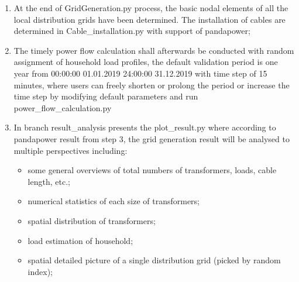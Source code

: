\documentclass[letterpaper,10pt,english]{sphinxmanual}
\begin{document}
\begin{enumerate}
\begin{itemize}
\item {} 
\sphinxAtStartPar
the optimal positions of manually grouped distribution grids are determined by minimal power\sphinxhyphen{}distance algorithm,
aiming to minimize the network voltage band, energy losses on conductors and with shorter total cable length;

\end{itemize}

\item {} 
\sphinxAtStartPar
At the end of GridGeneration.py process, the basic nodal elements of all the local distribution grids have been
determined. The installation of cables are determined in Cable\_installation.py with support of pandapower;

\item {} 
\sphinxAtStartPar
The timely power flow calculation shall afterwards be conducted with random assignment of household load profiles,
the default validation period is one year from 00:00:00 01.01.2019 \sphinxhyphen{} 24:00:00 31.12.2019 with time step of 15
minutes, where users can freely shorten or prolong the period or increase the time step by modifying default
parameters and run power\_flow\_calculation.py

\item {} 
\sphinxAtStartPar
In branch result\_analysis presents the plot\_result.py where according to pandapower result from step 3, the grid
generation result will be analysed to multiple perspectives including:
\begin{itemize}
\item {} 
\sphinxAtStartPar
some general overviews of total numbers of transformers, loads, cable length, etc.;

\item {} 
\sphinxAtStartPar
numerical statistics of each size of transformers;

\item {} 
\sphinxAtStartPar
spatial distribution of transformers;

\item {} 
\sphinxAtStartPar
load estimation of household;

\item {} 
\sphinxAtStartPar
spatial detailed picture of a single distribution grid (picked by random index);

\end{itemize}

\end{enumerate}
\end{document}
